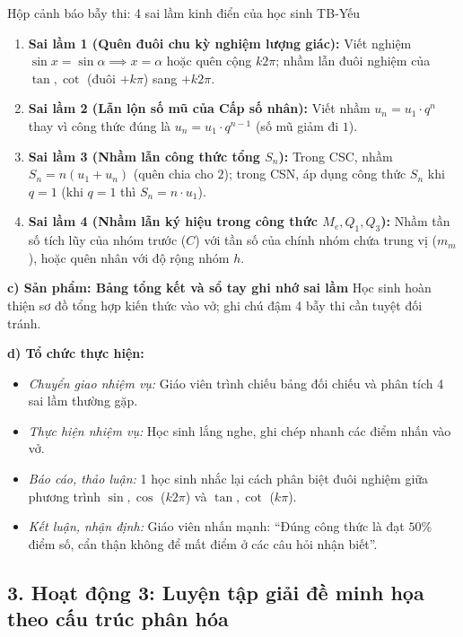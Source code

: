 \documentclass[12pt, a4paper]{article}
\begin{document}
\begin{scaffoldbox}{Hộp cảnh báo bẫy thi: 4 sai lầm kinh điển của học sinh TB-Yếu}
\begin{enumerate}[leftmargin=0.6cm]
    \item \textbf{Sai lầm 1 (Quên đuôi chu kỳ nghiệm lượng giác):} Viết nghiệm $\sin x = \sin \alpha \implies x = \alpha$ hoặc quên cộng $k2\pi$; nhầm lẫn đuôi nghiệm của $\tan, \cot$ (đuôi $+k\pi$) sang $+k2\pi$.
    \item \textbf{Sai lầm 2 (Lẫn lộn số mũ của Cấp số nhân):} Viết nhầm $u_n = u_1 \cdot q^n$ thay vì công thức đúng là $u_n = u_1 \cdot q^{n-1}$ (số mũ giảm đi $1$).
    \item \textbf{Sai lầm 3 (Nhầm lẫn công thức tổng $S_n$):} Trong CSC, nhầm $S_n = n(u_1 + u_n)$ (quên chia cho $2$); trong CSN, áp dụng công thức $S_n$ khi $q = 1$ (khi $q = 1$ thì $S_n = n \cdot u_1$).
    \item \textbf{Sai lầm 4 (Nhầm lẫn ký hiệu trong công thức $M_e, Q_1, Q_3$):} Nhầm tần số tích lũy của nhóm trước ($C$) với tần số của chính nhóm chứa trung vị ($m_m$), hoặc quên nhân với độ rộng nhóm $h$.
\end{enumerate}
\end{scaffoldbox}

\noindent \textbf{c) Sản phẩm: Bảng tổng kết và sổ tay ghi nhớ sai lầm}
Học sinh hoàn thiện sơ đồ tổng hợp kiến thức vào vở; ghi chú đậm 4 bẫy thi cần tuyệt đối tránh.

\noindent \textbf{d) Tổ chức thực hiện:}
\begin{itemize}[leftmargin=0.8cm]
    \item \textit{Chuyển giao nhiệm vụ:} Giáo viên trình chiếu bảng đối chiếu và phân tích 4 sai lầm thường gặp.
    \item \textit{Thực hiện nhiệm vụ:} Học sinh lắng nghe, ghi chép nhanh các điểm nhấn vào vở.
    \item \textit{Báo cáo, thảo luận:} 1 học sinh nhắc lại cách phân biệt đuôi nghiệm giữa phương trình $\sin, \cos$ ($k2\pi$) và $\tan, \cot$ ($k\pi$).
    \item \textit{Kết luận, nhận định:} Giáo viên nhấn mạnh: ``Đúng công thức là đạt $50\%$ điểm số, cẩn thận không để mất điểm ở các câu hỏi nhận biết''.
\end{itemize}

\subsection*{3. Hoạt động 3: Luyện tập giải đề minh họa theo cấu trúc phân hóa}
\end{document}
